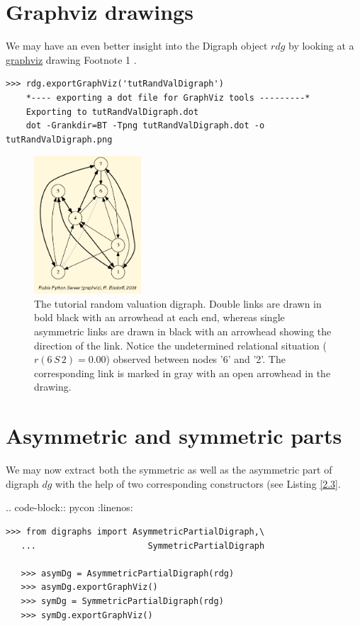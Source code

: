 \section{Graphviz drawings}
\label{sec:2.2}

We may have an even better insight into the Digraph object $rdg$ by looking at a \href{https://graphviz.org/}{graphviz}  drawing Footnote 1 .

\begin{lstlisting}[basicstyle=\footnotesize]
   >>> rdg.exportGraphViz('tutRandValDigraph')
    *---- exporting a dot file for GraphViz tools ---------*
    Exporting to tutRandValDigraph.dot
    dot -Grankdir=BT -Tpng tutRandValDigraph.dot -o tutRandValDigraph.png
\end{lstlisting}

\begin{figure}[h]
\sidecaption
\includegraphics[width=4cm]{Figures/tutRandValDigraph.png}
\caption{The tutorial random valuation digraph. Double links are drawn in bold black with an arrowhead at each end, whereas single asymmetric links are drawn in black with an arrowhead showing the direction of the link. Notice the undetermined relational situation ($r(6\,S\,2) = 0.00$) observed between nodes '6' and '2'. The corresponding link is marked in gray with an open arrowhead in the drawing.}
\label{fig:2.1}       %
\end{figure}
  
\section{Asymmetric and symmetric parts}
\label{sec:2.3}

We may now extract both the symmetric as well as the asymmetric part of digraph $dg$ with the help of two corresponding constructors (see Listing \ref{2.3}.

.. code-block:: pycon
   :linenos:
\begin{lstlisting}[caption=Computing asymmetric and symmetric Parts,label=list:2.3,basicstyle=\footnotesize]
   >>> from digraphs import AsymmetricPartialDigraph,\
   ...                      SymmetricPartialDigraph
   
   >>> asymDg = AsymmetricPartialDigraph(rdg)
   >>> asymDg.exportGraphViz()
   >>> symDg = SymmetricPartialDigraph(rdg)
   >>> symDg.exportGraphViz()
\end{lstlisting}


